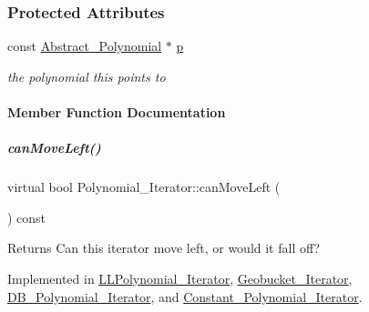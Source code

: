 \subsubsection*{Protected Attributes}
\begin{DoxyCompactItemize}
\item 
\mbox{\label{group___iterator_group_ab35e9b9c4d7ed12dabce5057a4c2a1b5}} 
const \hyperlink{group__polygroup_class_abstract___polynomial}{Abstract\+\_\+\+Polynomial} $\ast$ \hyperlink{group___iterator_group_ab35e9b9c4d7ed12dabce5057a4c2a1b5}{p}
\begin{DoxyCompactList}\small\item\em the polynomial {\ttfamily this} points to \end{DoxyCompactList}\end{DoxyCompactItemize}


\paragraph{Member Function Documentation}
\mbox{\label{group___iterator_group_a7ab348897446bc182500f84df8a9e590}} 
\subparagraph{\texorpdfstring{can\+Move\+Left()}{canMoveLeft()}}
{\footnotesize\ttfamily virtual bool Polynomial\+\_\+\+Iterator\+::can\+Move\+Left (\begin{DoxyParamCaption}{ }\end{DoxyParamCaption}) const\hspace{0.3cm}{\ttfamily [pure virtual]}}

\begin{DoxyReturn}{Returns}
Can this iterator move left, or would it fall off? 
\end{DoxyReturn}


Implemented in \hyperlink{group___iterator_group_a2df38ef3fd64b5e90432c754ce21f0c4}{L\+L\+Polynomial\+\_\+\+Iterator}, \hyperlink{group___iterator_group_a6c3db5961d5faf1b465c51e8935e0b89}{Geobucket\+\_\+\+Iterator}, \hyperlink{group___iterator_group_a4094a88fd6d77894ff04960efd492ec6}{D\+B\+\_\+\+Polynomial\+\_\+\+Iterator}, and \hyperlink{group___iterator_group_ade22e36aead8eca568dbd99c6ab73cc2}{Constant\+\_\+\+Polynomial\+\_\+\+Iterator}.

